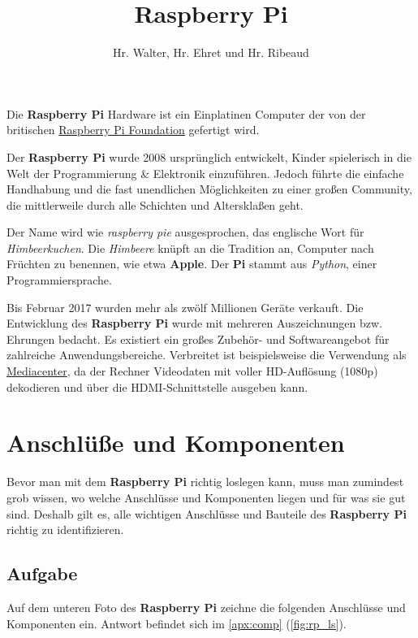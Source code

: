 \documentclass[12pt,a4paper]{article}
\newcommand{\rp}{\textbf{Raspberry Pi}\xspace}
\begin{document}
\title{Raspberry Pi \cite{book}}
\author{Hr. Walter, Hr. Ehret und Hr. Ribeaud}
\maketitle

Die \rp Hardware ist ein Einplatinen Computer der von der britischen \href{https://www.raspberrypi.org/}{Raspberry Pi Foundation} gefertigt wird.

Der \rp wurde 2008 ursprünglich entwickelt, Kinder spielerisch in die Welt der Programmierung \& Elektronik einzuführen. Jedoch führte die einfache Handhabung und die fast unendlichen Möglichkeiten zu einer großen Community, die mittlerweile durch alle Schichten und Altersklaßen geht.

Der Name wird wie \textit{raspberry pie} ausgesprochen, das englische Wort für \textit{Himbeerkuchen}. Die \textit{Himbeere} knüpft an die Tradition an, Computer nach Früchten zu benennen, wie etwa \textbf{Apple}. Der \textbf{Pi} stammt aus \textit{Python}, einer Programmiersprache.

Bis Februar 2017 wurden mehr als zwölf Millionen Geräte verkauft. Die Entwicklung des \rp wurde mit mehreren Auszeichnungen bzw. Ehrungen bedacht. Es existiert ein großes Zubehör- und Softwareangebot für zahlreiche Anwendungsbereiche. Verbreitet ist beispielsweise die Verwendung als \href{https://www.youtube.com/watch?v=YPu7oSVbMVo}{Mediacenter}, da der Rechner Videodaten mit voller HD-Auflösung (1080p) dekodieren und über die HDMI-Schnittstelle ausgeben kann. 

\section{Anschlüße und Komponenten}
\label{sec:comp}

Bevor man mit dem \rp richtig loslegen kann, muss man zumindest grob wissen, wo welche Anschlüsse und Komponenten liegen und für was sie gut sind. Deshalb gilt es, alle wichtigen Anschlüsse und Bauteile des \rp richtig zu identifizieren.

\subsection{Aufgabe}

Auf dem unteren Foto des \rp zeichne die folgenden Anschlüsse und Komponenten ein. Antwort befindet sich im \cref{apx:comp} (\cref{fig:rp_ls}).
\end{document}
